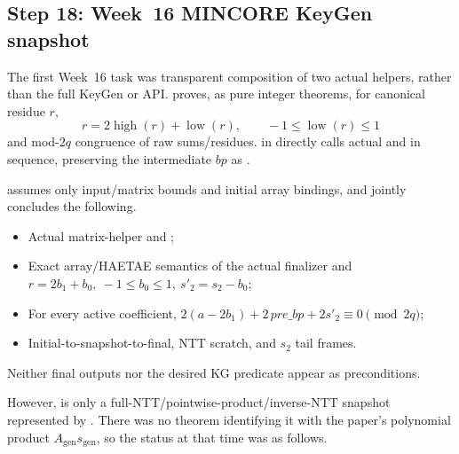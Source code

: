 \subsection{Step 18: Week~16 MINCORE KeyGen snapshot}

The first Week~16 task was transparent composition of two actual helpers,
rather than the full KeyGen or API. 
proves, as pure integer theorems, for canonical residue \(r\),
\[
  r=2\operatorname{high}(r)+\operatorname{low}(r),\qquad
  -1\le\operatorname{low}(r)\le1
\]
and mod-\(2q\) congruence of raw sums/residues.
 in
 directly calls actual
 and  in sequence,
preserving the intermediate \(bp\) as .

\begin{verified}
\label{thm:actual-keygen-snapshot}
 assumes only
input/matrix bounds and initial array bindings, and jointly concludes the following.
\begin{itemize}
  \item Actual matrix-helper  and
        ;
  \item Exact array/HAETAE semantics of the actual finalizer and
        \(r=2b_1+b_0,\ -1\le b_0\le1,\ s'_2=s_2-b_0\);
  \item For every active coefficient,
        \(2(a-2b_1)+2\,pre\_bp+2s'_2\equiv0\pmod{2q}\);
  \item Initial-to-snapshot-to-final, NTT scratch, and \(s_2\) tail frames.
\end{itemize}
Neither final outputs nor the desired KG predicate appear as preconditions.
\end{verified}

However,  is only a full-NTT/pointwise-product/inverse-NTT
snapshot represented by .
There was no theorem identifying it with the paper's polynomial product
\(A_{\mathrm{gen}}s_{\mathrm{gen}}\), so the status at that time was as follows.

